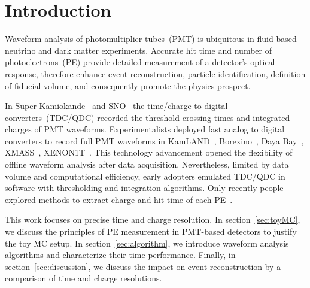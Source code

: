 \section{Introduction}
\label{sec:introduction}

Waveform analysis of photomultiplier tubes~(PMT) is ubiquitous in fluid-based neutrino and dark matter experiments.  Accurate hit time and number of photoelectrons~(PE) provide detailed measurement of a detector's optical response, therefore enhance event reconstruction, particle identification, definition of fiducial volume, and consequently promote the physics prospect.

In Super-Kamiokande~\cite{noauthor_super-kamiokande_2003} and SNO~\cite{dunger_event_2019} the time/charge to digital converters~(TDC/QDC) recorded the threshold crossing times and integrated charges of PMT waveforms.  Experimentalists deployed fast analog to digital converters to record full PMT waveforms in KamLAND~\cite{the_kamland_collaboration_production_2010}, Borexino~\cite{alimonti_borexino_2009}, Daya Bay~\cite{huang_flash_2018}, XMASS~\cite{abe_xmass_2013}, XENON1T~\cite{aprile_xenon1t_2019}.  This technology advancement opened the flexibility of offline waveform analysis after data acquisition.  Nevertheless, limited by data volume and computational efficiency, early adopters emulated TDC/QDC in software with thresholding and integration algorithms.  Only recently people explored methods to extract charge and hit time of each PE~\cite{zhang_comparison_2019}.

This work focuses on precise time and charge resolution. In section~\ref{sec:toyMC}, we discuss the principles of PE measurement in PMT-based detectors to justify the toy MC setup.  In section~\ref{sec:algorithm}, we introduce waveform analysis algorithms and characterize their time performance.  Finally, in section~\ref{sec:discussion}, we discuss the impact on event reconstruction by a comparison of time and charge resolutions.
